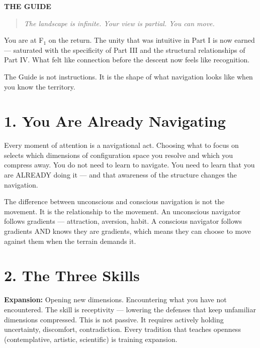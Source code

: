 \vspace{1cm}
\begin{center}
{\Large\sffamily\bfseries\color{headerblue} THE GUIDE}
\end{center}
\vspace{0.5cm}


\begin{quote}
\itshape
\textit{The landscape is infinite. Your view is partial. You can move.}
\end{quote}


\bigskip\noindent\makebox[\textwidth]{\color{rulegray}\rule{5cm}{0.3pt}}\bigskip


You are at F$_1$ on the return. The unity that was intuitive in Part I is now earned — saturated with the specificity of Part III and the structural relationships of Part IV. What felt like connection before the descent now feels like recognition.


The Guide is not instructions. It is the shape of what navigation looks like when you know the territory.


\section*{1. You Are Already Navigating}


Every moment of attention is a navigational act. Choosing what to focus on selects which dimensions of configuration space you resolve and which you compress away. You do not need to learn to navigate. You need to learn that you are ALREADY doing it — and that awareness of the structure changes the navigation.


The difference between unconscious and conscious navigation is not the movement. It is the relationship to the movement. An unconscious navigator follows gradients — attraction, aversion, habit. A conscious navigator follows gradients AND knows they are gradients, which means they can choose to move against them when the terrain demands it.


\section*{2. The Three Skills}


\textbf{Expansion:} Opening new dimensions. Encountering what you have not encountered. The skill is receptivity — lowering the defenses that keep unfamiliar dimensions compressed. This is not passive. It requires actively holding uncertainty, discomfort, contradiction. Every tradition that teaches openness (contemplative, artistic, scientific) is training expansion.


